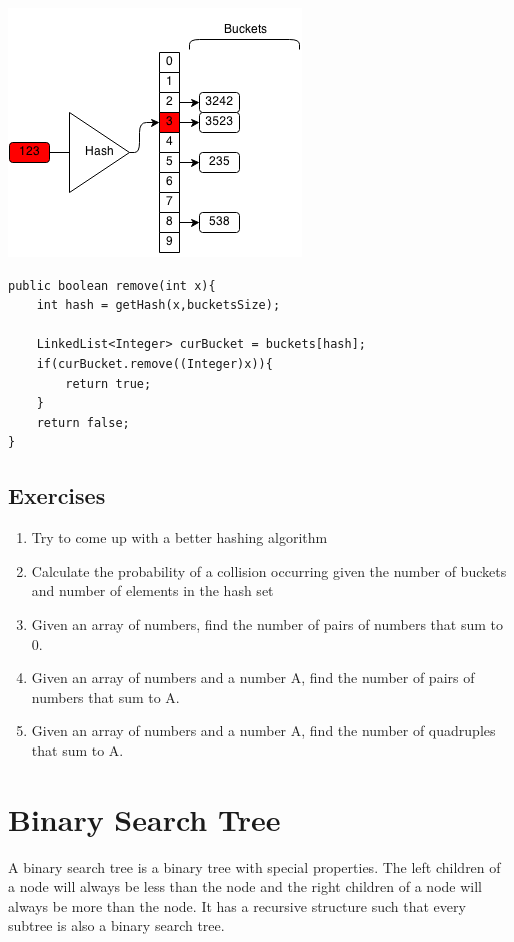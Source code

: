 \documentclass[11pt,oneside]{book}
\makeatletter
\def\maxwidth#1{\ifdim\Gin@nat@width>#1 #1\else\Gin@nat@width\fi}
\makeatother
\begin{document}
\vspace{5px}\includegraphics[width=\maxwidth{\textwidth}]{hashsetrem3.png}

\begin{lstlisting}
public boolean remove(int x){
    int hash = getHash(x,bucketsSize);
    
    LinkedList<Integer> curBucket = buckets[hash];
    if(curBucket.remove((Integer)x)){
        return true;
    }
    return false;
}
\end{lstlisting}

\subsection{Exercises}

\begin{enumerate}
\item Try to come up with a better hashing algorithm
\item Calculate the probability of a collision occurring given the number of buckets and number of elements in the hash set
\item Given an array of numbers, find the number of pairs of numbers that sum to 0.
\item Given an array of numbers and a number A, find the number of pairs of numbers that sum to A.
\item Given an array of numbers and a number A, find the number of quadruples that sum to A.
\end{enumerate}

        \section{ Binary Search Tree }
        

A binary search tree is a  binary tree with special properties. The left children of a node will always be less than the node and the right children of a node will always be more than the node. It has a recursive structure such that every subtree is also a binary search tree.
\end{document}
